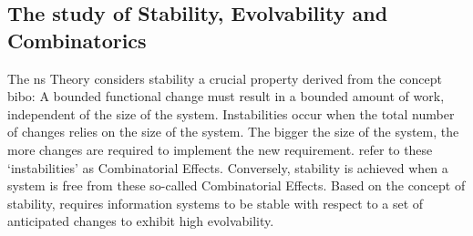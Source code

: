 \subsection{The study of Stability, Evolvability and Combinatorics} \label{subsec_on_stability}

The \gls{ns} Theory considers stability a crucial property derived from the concept
\gls{bibo}: A bounded functional change must result in a bounded amount of work,
independent of the size of the system. Instabilities occur when the total number of
changes relies on the size of the system. The bigger the size of the system, the more
changes are required to implement the new requirement.
\textcite[271]{mannaert_normalized_2016} refer to these \enquote*{instabilities} as
Combinatorial Effects. Conversely, stability is achieved when a system is free from these
so-called Combinatorial Effects. Based on the concept of stability,
\textcite{mannaert_towards_2012} requires information systems to be stable with respect to
a set of anticipated changes to exhibit high evolvability.